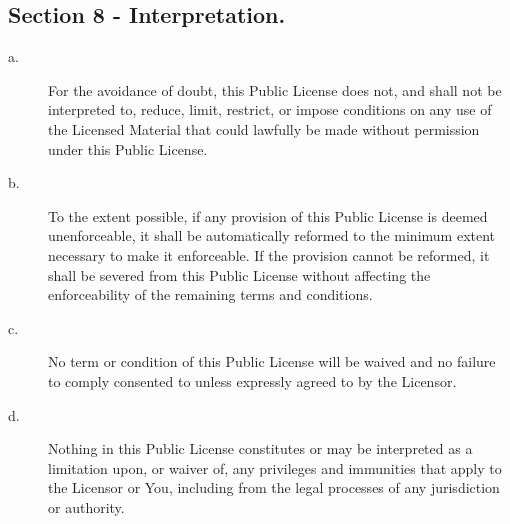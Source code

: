 \subsection{Section 8 - Interpretation.}
\begin{description}
\item [a.] For the avoidance of doubt, this Public License does not, and shall not be interpreted to, reduce, limit, restrict, or impose conditions on any use of the Licensed Material that could lawfully be made without permission under this Public License.
\item [b.] To the extent possible, if any provision of this Public License is deemed unenforceable, it shall be automatically reformed to the minimum extent necessary to make it enforceable. If the provision cannot be reformed, it shall be severed from this Public License without affecting the enforceability of the remaining terms and conditions.
\item [c.] No term or condition of this Public License will be waived and no failure to comply consented to unless expressly agreed to by the Licensor.
\item [d.] Nothing in this Public License constitutes or may be interpreted as a limitation upon, or waiver of, any privileges and immunities that apply to the Licensor or You, including from the legal processes of any jurisdiction or authority.
\end{description}
